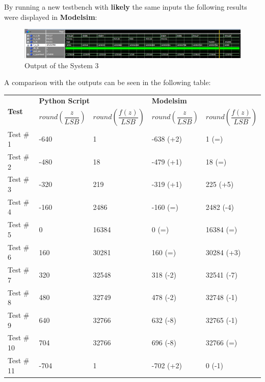 By running a new testbench with \textbf{likely} the same inputs the following results were displayed in \textbf{Modelsim}:
\begin{figure}[H]
	\centering
	\caption{Output of the System 3}
	\includegraphics[width=\textwidth]{img/aimed_test.png}
\end{figure}

A comparison with the outputs can be seen in the following table:
\begingroup
\setlength{\tabcolsep}{10pt} %
\renewcommand{\arraystretch}{2} %
\begin{center}
	\begin{tabular}{|p{2cm}||p{2.4cm}|p{2.4cm}|p{2.4cm}|p{2.4cm}|}
		\hline
		\multirow{2}{*}{\textbf{Test}}  & \multicolumn{2}{|p{3cm}|}{\textbf{Python Script}} & \multicolumn{2}{|p{3cm}|}{\textbf{Modelsim}} \\
		\cline{2-5}
		 & $round\left(\dfrac{z}{LSB}\right)$ & $round\left(\dfrac{f(z)}{LSB}\right)$ &  $round\left(\dfrac{z}{LSB}\right)$ & $round\left(\dfrac{f(z)}{LSB}\right)$ \\
		\hline
		Test $\#$1 & -640 & 1 & -638 (+2) & 1 (=)\\
		Test $\#$2 & -480 & 18 & -479 (+1) & 18 (=)\\
		Test $\#$3 & -320 & 219 & -319 (+1) & 225 (+5)\\
		Test $\#$4 & -160 & 2486 & -160 (=) & 2482 (-4)\\
		Test $\#$5 & 0 & 16384 & 0 (=) & 16384 (=)\\
		Test $\#$6 & 160 & 30281 & 160 (=) & 30284 (+3)\\
		Test $\#$7 & 320 & 32548 & 318 (-2) & 32541 (-7)\\
		Test $\#$8 & 480 & 32749 & 478 (-2) & 32748 (-1)\\
		Test $\#$9 & 640 & 32766 & 632 (-8) & 32765 (-1)\\
		Test $\#$10 & 704 & 32766 & 696 (-8) & 32766 (=)\\
		Test $\#$11 & -704 & 1 & -702 (+2) & 0 (-1)\\
		\hline
	\end{tabular}
\end{center}
\endgroup

